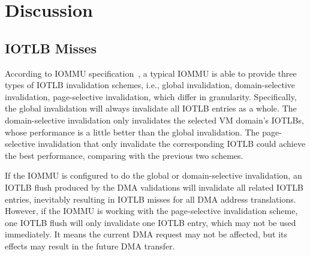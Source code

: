 \section{Discussion}\label{sec:dis}

\subsection{IOTLB Misses}
According to IOMMU specification~\cite{intelvt, amdvt}, a typical IOMMU is able to provide three types of IOTLB invalidation schemes, i.e., global invalidation, domain-selective invalidation, page-selective invalidation, which differ in granularity.
Specifically, the global invalidation will always invalidate all IOTLB entries as a whole.
The domain-selective invalidation only invalidates the selected VM domain's IOTLBs, whose performance is a little better than the global invalidation.
The page-selective invalidation that only invalidate the corresponding IOTLB could achieve the best performance, comparing with the previous two schemes.

If the IOMMU is configured to do the global or domain-selective invalidation, an IOTLB flush produced by the DMA validations will invalidate all related IOTLB entries, inevitably resulting in IOTLB misses for all DMA address translations. However, if the IOMMU is working with the page-selective invalidation scheme, one IOTLB flush will only invalidate one IOTLB entry, which may not be used immediately. It means the current DMA request may not be affected, but its effects may result in the future DMA transfer.

